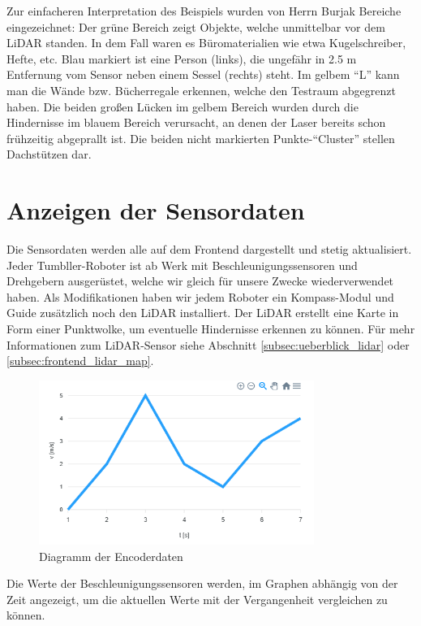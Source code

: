 Zur einfacheren Interpretation des Beispiels
wurden von Herrn Burjak Bereiche eingezeichnet:
%
Der grüne Bereich zeigt Objekte,
welche unmittelbar vor dem LiDAR standen.
%
In dem Fall waren es Büromaterialien wie etwa Kugelschreiber, Hefte, etc.
%
Blau markiert ist eine Person (links),
die ungefähr in 2.5 m Entfernung vom Sensor
neben einem Sessel (rechts) steht.
%
Im gelbem ``L'' kann man die Wände bzw. Bücherregale erkennen,
welche den Testraum abgegrenzt haben.
Die beiden großen Lücken im gelbem Bereich wurden
durch die Hindernisse im blauem Bereich verursacht,
an denen der Laser bereits schon frühzeitig abgeprallt ist.
%
Die beiden nicht markierten Punkte-``Cluster'' stellen Dachstützen dar.

\section{Anzeigen der Sensordaten}
\label{subsec:frontend_sensors}
Die Sensordaten werden alle auf dem Frontend dargestellt und stetig aktualisiert.
%
Jeder Tumbller-Roboter ist ab Werk mit Beschleunigungssensoren und Drehgebern ausgerüstet,
welche wir gleich für unsere Zwecke wiederverwendet haben.
%
Als Modifikationen haben wir jedem Roboter ein Kompass-Modul
und Guide zusätzlich noch den LiDAR installiert.
%
Der LiDAR erstellt eine Karte in Form einer Punktwolke,
um eventuelle Hindernisse erkennen zu können.
%
Für mehr Informationen zum LiDAR-Sensor siehe Abschnitt \ref{subsec:ueberblick_lidar} oder \ref{subsec:frontend_lidar_map}.

\begin{figure}[H]
    \includegraphics[width=0.8\textwidth, center]{img/encoder_chart.png}
    \caption{Diagramm der Encoderdaten}
    \label{fig:Encoderdaten}
\end{figure}

Die Werte der Beschleunigungssensoren werden,
im Graphen abhängig von der Zeit angezeigt, 
um die aktuellen Werte mit der Vergangenheit vergleichen zu können.


